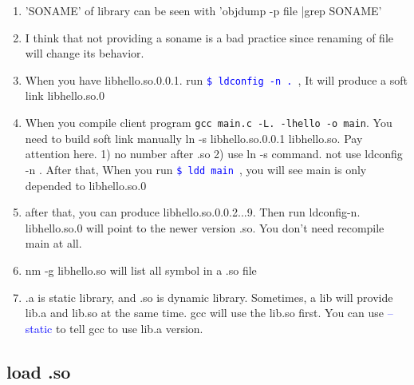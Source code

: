 \documentclass[a4paper,11pt,twoside]{book}
\newcommand{\linuxcommand}[1]{\texttt{\textcolor{blue}{\$ #1 \Pisymbol{psy}{191}}}}
\newcommand{\op}[1]{\textcolor{blue}{-#1}}
\begin{document}
\begin{itemize}
\begin{enumerate}
				\item 'SONAME' of library can be seen with 'objdump -p file |grep SONAME'

						\item I think that not providing a soname is a bad practice since renaming of file will change its behavior.
		
		\item When you have libhello.so.0.0.1. run \linuxcommand{ldconfig -n .}, It will produce a soft link libhello.so.0
		\item When you compile client program
		\verb=gcc main.c -L. -lhello -o main=. You need to build soft link manually 
		ln -s libhello.so.0.0.1 libhello.so. Pay attention here. 1) no number after .so 2) use ln -s command. not use ldconfig -n . After that, When you run \linuxcommand{ldd main}, you will see main is only depended to libhello.so.0
		
		\item after that, you can produce libhello.so.0.0.2...9. Then run ldconfig-n. libhello.so.0 will point to the newer version .so. You don't need recompile main at all.  

		\item nm -g libhello.so will list all symbol in a .so file
		
		  \item .a is static library, and .so is dynamic library. Sometimes, a lib will provide lib.a and lib.so at the same time. gcc will use the lib.so first. You can use \op{-static} to tell gcc to use lib.a version.
	\end{enumerate}
	
\end{itemize}
\subsection{load .so}
\end{document}
